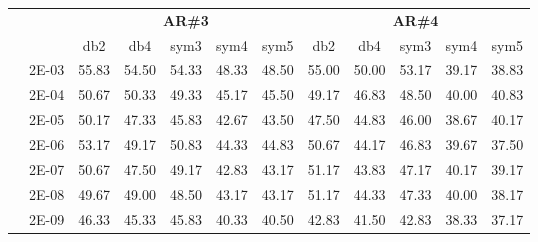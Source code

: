 \begin{table}[H]
\begin{tabular}{|c|c|c c c c c|c c c c c|}
\cline{3-12}
\multicolumn{2}{c}{} & \multicolumn{5}{|c|}{\textbf{AR\#3}}  & \multicolumn{5}{c|}{\textbf{AR\#4}} \\\cline{3-12}
\multicolumn{2}{c}{}  & \multicolumn{1}{|c}{db2} & db4 & sym3 & sym4 & sym5 & db2 & db4& sym3 & sym4 & sym5 \\\hline
\multicolumn{1}{|c|}{ \multirow{6}{*}{\rotatebox[origin=c]{90}{\textbf{Gamma}}} }
&2E-03&	55.83&	54.50&	54.33&	48.33&	48.50&	55.00&	50.00&	53.17&	39.17&	38.83	\\\cline{2-12}
&2E-04&	50.67&	50.33&	49.33&	45.17&	45.50&	49.17&	46.83&	48.50&	40.00&	40.83	\\\cline{2-12}
&2E-05&	50.17&	47.33&	45.83&	42.67&	43.50&	47.50&	44.83&	46.00&	38.67&	40.17	\\\cline{2-12}
&2E-06&	53.17&	49.17&	50.83&	44.33&	44.83&	50.67&	44.17&	46.83&	39.67&	37.50	\\\cline{2-12}
&2E-07&	50.67&	47.50&	49.17&	42.83&	43.17&	51.17&	43.83&	47.17&	40.17&	39.17	\\\cline{2-12}
&2E-08&	49.67&	49.00&	48.50&	43.17&	43.17&	51.17&	44.33&	47.33&	40.00&	38.17	\\\cline{2-12}
&2E-09&	46.33&	45.33&	45.83&	40.33&	40.50&	42.83&	41.50&	42.83&	38.33&	37.17	

\\\midrule
\end{tabular}
\end{table}


